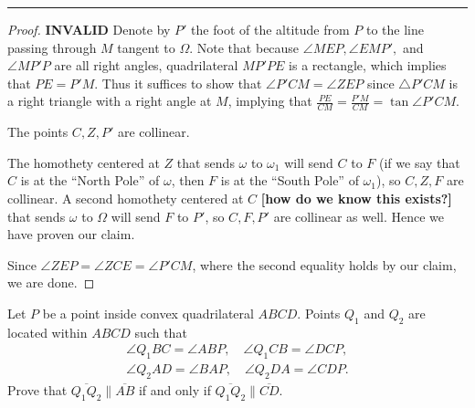 \documentclass[letterpaper,oneside]{scrartcl}
\providecommand{\hrulebar}{\par
\hspace{\fill}\rule{0.95\linewidth}{.7pt}\hspace{\fill}
\par\nointerlineskip \vspace{\baselineskip}}
\begin{document}
\hrulebar
\begin{proof}
  \textbf{INVALID} Denote by \(P'\) the foot of the altitude from \(P\) to the line passing through \(M\) tangent to \(\Omega\). Note that because \(\angle MEP, \angle EMP',\) and \(\angle MP'P\) are all right angles, quadrilateral \(MP'PE\) is a rectangle, which implies that \(PE = P'M\). Thus it suffices to show that \(\angle P'CM = \angle ZEP\) since \(\triangle P'CM\) is a right triangle with a right angle at \(M\), implying that \(\frac{PE}{CM} = \frac{P'M}{CM} = \tan\angle P'CM\).
  \begin{claim*}
    The points \(C,Z,P'\) are collinear.
  \end{claim*}
  \begin{subproof}
    The homothety centered at \(Z\) that sends \(\omega\) to \(\omega_1\) will send \(C\) to \(F\) (if we say that \(C\) is at the ``North Pole'' of \(\omega\), then \(F\) is at the ``South Pole'' of \(\omega_1\)), so \(C,Z,F\) are collinear. A second homothety centered at \(C\) \textbf{[how do we know this exists?]} that sends \(\omega\) to \(\Omega\) will send \(F\) to \(P'\), so \(C,F,P'\) are collinear as well. Hence we have proven our claim.
  \end{subproof}
   Since \(\angle ZEP = \angle ZCE = \angle P'CM\), where the second equality holds by our claim, we are done.
\end{proof}
\begin{problem*}
  [4.47, USAMO 2011/5]
  Let $P$ be a point inside convex quadrilateral $ABCD$. Points $Q_1$ and $Q_2$ are located within $ABCD$ such that
  \begin{align*}
  \angle Q_1BC=\angle ABP,\quad\angle Q_1CB=\angle DCP,\\
  \angle Q_2AD=\angle BAP,\quad\angle Q_2DA=\angle CDP.
  \end{align*}
  Prove that $\overline{Q_1Q_2}\parallel\overline{AB}$ if and only if $\overline{Q_1Q_2}\parallel\overline{CD}.$
\end{problem*}
\end{document}
